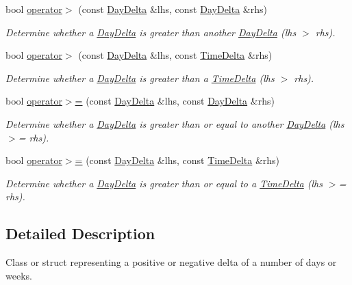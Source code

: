 \begin{DoxyCompactItemize}
bool \hyperlink{structDayDelta_aaf9360c064df44a15781807e4a26c296}{operator$>$} (const \hyperlink{structDayDelta}{Day\-Delta} \&lhs, const \hyperlink{structDayDelta}{Day\-Delta} \&rhs)
\begin{DoxyCompactList}\small\item\em Determine whether a \hyperlink{structDayDelta}{Day\-Delta} is greater than another \hyperlink{structDayDelta}{Day\-Delta} (lhs $>$ rhs). \end{DoxyCompactList}\item 
bool \hyperlink{structDayDelta_a082c139cbfcebb76ff647eff274c005e}{operator$>$} (const \hyperlink{structDayDelta}{Day\-Delta} \&lhs, const \hyperlink{structTimeDelta}{Time\-Delta} \&rhs)
\begin{DoxyCompactList}\small\item\em Determine whether a \hyperlink{structDayDelta}{Day\-Delta} is greater than a \hyperlink{structTimeDelta}{Time\-Delta} (lhs $>$ rhs). \end{DoxyCompactList}\item 
bool \hyperlink{structDayDelta_a78c4c340fdd0331b761215aeb08f56e6}{operator$>$=} (const \hyperlink{structDayDelta}{Day\-Delta} \&lhs, const \hyperlink{structDayDelta}{Day\-Delta} \&rhs)
\begin{DoxyCompactList}\small\item\em Determine whether a \hyperlink{structDayDelta}{Day\-Delta} is greater than or equal to another \hyperlink{structDayDelta}{Day\-Delta} (lhs $>$= rhs). \end{DoxyCompactList}\item 
bool \hyperlink{structDayDelta_a71044975661533f23b8dcbb1cca79bc7}{operator$>$=} (const \hyperlink{structDayDelta}{Day\-Delta} \&lhs, const \hyperlink{structTimeDelta}{Time\-Delta} \&rhs)
\begin{DoxyCompactList}\small\item\em Determine whether a \hyperlink{structDayDelta}{Day\-Delta} is greater than or equal to a \hyperlink{structTimeDelta}{Time\-Delta} (lhs $>$= rhs). \end{DoxyCompactList}\end{DoxyCompactItemize}


\subsection{Detailed Description}
Class or struct representing a positive or negative delta of a number of days or weeks. 

